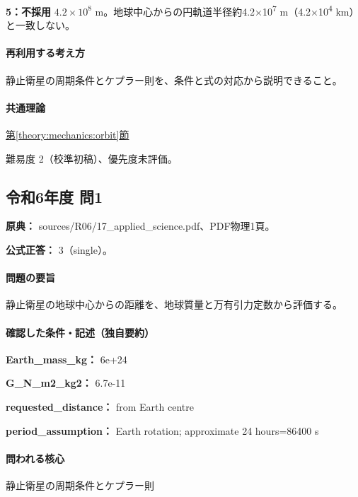 \noindent\textbf{5：不採用} \(4.2\times10^8\) m。地球中心からの円軌道半径約4.2×10\textsuperscript{7} m（4.2×10\textsuperscript{4} km）と一致しない。\par

\paragraph{再利用する考え方} 静止衛星の周期条件とケプラー則を、条件と式の対応から説明できること。

\paragraph{共通理論} \hyperref[theory:mechanics:orbit]{第\ref*{theory:mechanics:orbit}節}

\par 難易度 2（校準初稿）、優先度未評価。

\subsection{令和6年度 問1}
\label{q:r06-reg-applied-01}

\noindent\textbf{原典：} sources/R06/17\_applied\_science.pdf、PDF物理1頁。

\textbf{公式正答：} 3（single）。

\paragraph{問題の要旨} 静止衛星の地球中心からの距離を、地球質量と万有引力定数から評価する。

\paragraph{確認した条件・記述（独自要約）}\mbox{}\par

\noindent\textbf{Earth\_mass\_kg：} 6e+24\par

\noindent\textbf{G\_N\_m2\_kg2：} 6.7e-11\par

\noindent\textbf{requested\_distance：} from Earth centre\par

\noindent\textbf{period\_assumption：} Earth rotation; approximate 24 hours=\allowbreak{}86400 s\par

\paragraph{問われる核心} 静止衛星の周期条件とケプラー則

